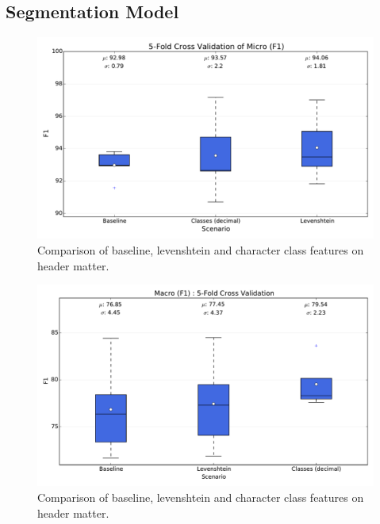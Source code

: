 \subsection{Segmentation Model}

\begin{figure}[h]
\center
\includegraphics[width=5.5in]{Figures/micro.pdf}
\caption{Comparison of baseline, levenshtein and character class features on header matter.}
\label{fig:micro}
\end{figure}

\begin{figure}[h]
\center
\includegraphics[width=5.5in]{Figures/macro.pdf}
\caption{Comparison of baseline, levenshtein and character class features on header matter.}
\label{fig:macro}
\end{figure}

